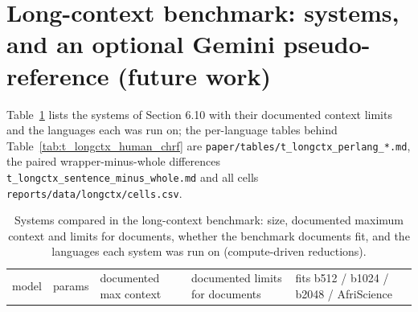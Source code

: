\section{Long-context benchmark: systems, and an optional Gemini pseudo-reference (future work)}\label{long-context-benchmark-systems-and-an-optional-gemini-pseudo-reference-future-work}

Table~\ref{tab:t_longctx_models} lists the systems of Section 6.10 with their documented context limits and the languages each was run on; the per-language tables behind Table~\ref{tab:t_longctx_human_chrf} are \texttt{paper/tables/t\_longctx\_perlang\_*.md}, the paired wrapper-minus-whole differences \texttt{t\_longctx\_sentence\_minus\_whole.md} and all cells \texttt{reports/data/longctx/cells.csv}.

\begin{table}[t]
\centering
\footnotesize
\setlength{\tabcolsep}{3pt}
\caption{Systems compared in the long-context benchmark: size, documented maximum context and limits for documents, whether the benchmark documents fit, and the languages each system was run on (compute-driven reductions).}
\label{tab:t_longctx_models}
{\def\LTcaptype{none} %
\begin{tabular}{@{}
  >{\raggedright\arraybackslash}p{}
  >{\raggedleft\arraybackslash}p{}
  >{\raggedleft\arraybackslash}p{}
  >{\raggedleft\arraybackslash}p{}
  >{\raggedleft\arraybackslash}p{}
  >{\raggedleft\arraybackslash}p{}@{}}
\toprule
\begin{minipage}[b]{\linewidth}\raggedright
model
\end{minipage} & \begin{minipage}[b]{\linewidth}\raggedleft
params
\end{minipage} & \begin{minipage}[b]{\linewidth}\raggedleft
documented max context
\end{minipage} & \begin{minipage}[b]{\linewidth}\raggedleft
documented limits for documents
\end{minipage} & \begin{minipage}[b]{\linewidth}\raggedleft
fits b512 / b1024 / b2048 / AfriScience
\end{minipage} & \begin{minipage}[b]{\linewidth}\raggedleft

\end{minipage}
\end{tabular}}
\end{table}
